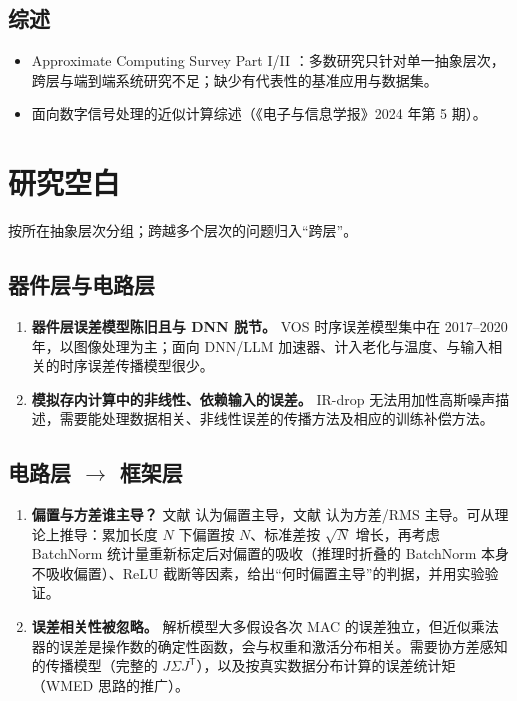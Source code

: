 \documentclass[11pt,a4paper]{ctexart}
\begin{document}
\subsection{综述}
\begin{itemize}[leftmargin=*]
  \item Approximate Computing Survey Part I/II \cite{acsurvey1,acsurvey2}：多数研究只针对单一抽象层次，跨层与端到端系统研究不足；缺少有代表性的基准应用与数据集。
  \item 面向数字信号处理的近似计算综述（《电子与信息学报》2024 年第 5 期）\cite{dspsurvey}。
\end{itemize}

\section{研究空白}

按所在抽象层次分组；跨越多个层次的问题归入“跨层”。

\subsection{器件层与电路层}
\begin{enumerate}[leftmargin=*,label=\textbf{\arabic*.}]
  \item \textbf{器件层误差模型陈旧且与 DNN 脱节。} VOS 时序误差模型集中在 2017--2020 年，以图像处理为主；面向 DNN/LLM 加速器、计入老化与温度、与输入相关的时序误差传播模型很少。
  \item \textbf{模拟存内计算中的非线性、依赖输入的误差。} IR-drop 无法用加性高斯噪声描述，需要能处理数据相关、非线性误差的传播方法及相应的训练补偿方法。
\end{enumerate}

\subsection{电路层 $\rightarrow$ 框架层}
\begin{enumerate}[leftmargin=*,label=\textbf{\arabic*.},resume]
  \item \textbf{偏置与方差谁主导？} 文献 \cite{amierr} 认为偏置主导，文献 \cite{hwapproxsurvey} 认为方差/RMS 主导。可从理论上推导：累加长度 $N$ 下偏置按 $N$、标准差按 $\sqrt{N}$ 增长，再考虑 BatchNorm 统计量重新标定后对偏置的吸收（推理时折叠的 BatchNorm 本身不吸收偏置）、ReLU 截断等因素，给出“何时偏置主导”的判据，并用实验验证。
  \item \textbf{误差相关性被忽略。} 解析模型大多假设各次 MAC 的误差独立，但近似乘法器的误差是操作数的确定性函数，会与权重和激活分布相关。需要协方差感知的传播模型（完整的 $J\Sigma J^{\mathsf T}$），以及按真实数据分布计算的误差统计矩（WMED 思路的推广）。
\end{enumerate}
\end{document}
